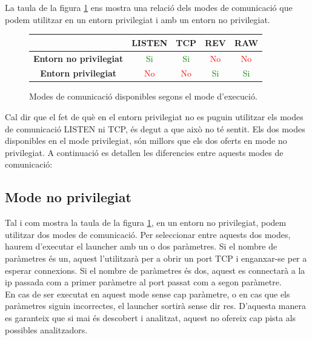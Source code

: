 La taula de la figura  \ref{fig:tableModesRelation} ens mostra una relació dels modes de comunicació que podem utilitzar
en un entorn privilegiat i amb un entorn no privilegiat.

\begin{figure}[htp]
    \centering
    \begin{tabular}{|c|c|c|c|c|}
        \hline
         & \textbf{LISTEN} & \textbf{TCP} & \textbf{REV} & \textbf{RAW} \\ \hline
         \textbf{Entorn no privilegiat} & \textcolor{Green}{Si} & \textcolor{Green}{Si} & \textcolor{Red}{No} & \textcolor{Red}{No} \\ \hline
         \textbf{Entorn privilegiat} & \textcolor{Red}{No} & \textcolor{Red}{No} & \textcolor{Green}{Si} & \textcolor{Green}{Si} \\ \hline
    \end{tabular}
    \caption{Modes de comunicació disponibles segons el mode d'execució.}
    \label{fig:tableModesRelation}
\end{figure}

Cal dir que el fet de què en el entorn privilegiat no es puguin utilitzar els modes de comunicació LISTEN ni TCP, és degut
a que això no té sentit. Els dos modes disponibles en el mode privilegiat, són millors que els dos oferts en mode no
privilegiat. A continuació es detallen les diferencies entre aquests modes de comunicació:

\subsection{Mode no privilegiat}

Tal i com mostra la taula de la figura \ref{fig:tableModesRelation}, en un entorn no privilegiat, podem utilitzar dos modes de
comunicació. Per seleccionar entre aquests dos modes, haurem d'executar el launcher amb un o dos paràmetres. Si el nombre de
paràmetres és un, aquest l'utilitzarà per a obrir un port TCP i enganxar-se per a esperar connexions. Si el nombre de paràmetres
és dos, aquest es connectarà a la ip passada com a primer paràmetre al port passat com a segon paràmetre. \\

En cas de ser executat en aquest mode sense cap paràmetre, o en cas que els paràmetres siguin incorrectes, el launcher sortirà
sense dir res. D'aquesta manera es garanteix que si mai és descobert i analitzat, aquest no ofereix cap pista als possibles analitzadors. \\

